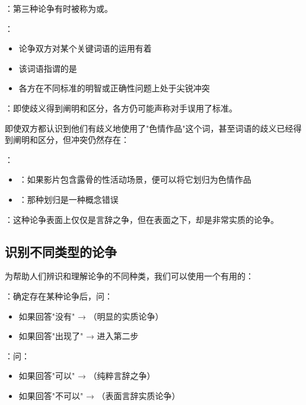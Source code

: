 \begin{theorembox}[title=标准之争与概念之争]
：第三种论争有时被称为或。

：
\begin{itemize}
  \item 论争双方对某个关键词语的运用有着
  \item 该词语指谓的是
  \item 各方在不同标准的明智或正确性问题上处于尖锐冲突
\end{itemize}

：即使歧义得到阐明和区分，各方仍可能声称对手误用了标准。
\end{theorembox}

\begin{examplebox}[title=色情作品争议的深层分析]
即使双方都认识到他们有歧义地使用了"色情作品"这个词，甚至词语的歧义已经得到阐明和区分，但冲突仍然存在：

：
\begin{itemize}
  \item {}：如果影片包含露骨的性活动场景，便可以将它划归为色情作品
  \item {}：那种划归是一种概念错误
\end{itemize}

：这种论争表面上仅仅是言辞之争，但在表面之下，却是非常实质的论争。
\end{examplebox}

\subsection{识别不同类型的论争}

\begin{theorembox}[title=论争类型识别流程]
为帮助人们辨识和理解论争的不同种类，我们可以使用一个有用的：

：确定存在某种论争后，问：
\begin{itemize}
  \item 如果回答"没有" → （明显的实质论争）
  \item 如果回答"出现了" → 进入第二步
\end{itemize}

：问：
\begin{itemize}
  \item 如果回答"可以" → （纯粹言辞之争）
  \item 如果回答"不可以" → （表面言辞实质论争）
\end{itemize}
\end{theorembox}

